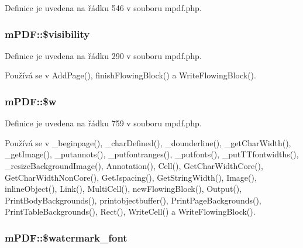 Definice je uvedena na řádku 546 v souboru mpdf.\-php.

\hypertarget{classm_p_d_f_acffc0ef71fd538a7390b4188e80650d5}{
\subsubsection[{\$visibility}]{\setlength{\rightskip}{0pt plus 5cm}m\-P\-D\-F\-::\$visibility}}\label{classm_p_d_f_acffc0ef71fd538a7390b4188e80650d5}


Definice je uvedena na řádku 290 v souboru mpdf.\-php.



Používá se v Add\-Page(), finish\-Flowing\-Block() a Write\-Flowing\-Block().

\hypertarget{classm_p_d_f_aceefbb6ef8fd2dfaf307520d18d965f1}{
\subsubsection[{\$w}]{\setlength{\rightskip}{0pt plus 5cm}m\-P\-D\-F\-::\$w}}\label{classm_p_d_f_aceefbb6ef8fd2dfaf307520d18d965f1}


Definice je uvedena na řádku 759 v souboru mpdf.\-php.



Používá se v \-\_\-beginpage(), \-\_\-char\-Defined(), \-\_\-dounderline(), \-\_\-get\-Char\-Width(), \-\_\-get\-Image(), \-\_\-putannots(), \-\_\-putfontranges(), \-\_\-putfonts(), \-\_\-put\-T\-Tfontwidths(), \-\_\-resize\-Background\-Image(), Annotation(), Cell(), Get\-Char\-Width\-Core(), Get\-Char\-Width\-Non\-Core(), Get\-Jspacing(), Get\-String\-Width(), Image(), inline\-Object(), Link(), Multi\-Cell(), new\-Flowing\-Block(), Output(), Print\-Body\-Backgrounds(), printobjectbuffer(), Print\-Page\-Backgrounds(), Print\-Table\-Backgrounds(), Rect(), Write\-Cell() a Write\-Flowing\-Block().

\hypertarget{classm_p_d_f_a141a9e9d63dc5c99ccc87ffe9c788456}{
\subsubsection[{\$watermark\-\_\-font}]{\setlength{\rightskip}{0pt plus 5cm}m\-P\-D\-F\-::\$watermark\-\_\-font}}\label{classm_p_d_f_a141a9e9d63dc5c99ccc87ffe9c788456}


